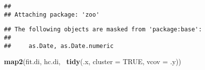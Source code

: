 \documentclass[]{article}
\newenvironment{Shaded}{\begin{snugshade}}{\end{snugshade}}
\newcommand{\KeywordTok}[1]{\textcolor[rgb]{0.13,0.29,0.53}{\textbf{{#1}}}}
\newcommand{\DataTypeTok}[1]{\textcolor[rgb]{0.13,0.29,0.53}{{#1}}}
\newcommand{\StringTok}[1]{\textcolor[rgb]{0.31,0.60,0.02}{{#1}}}
\newcommand{\OtherTok}[1]{\textcolor[rgb]{0.56,0.35,0.01}{{#1}}}
\newcommand{\NormalTok}[1]{{#1}}
\begin{document}
\begin{Shaded}
\end{Shaded}

\begin{verbatim}
## 
## Attaching package: 'zoo'
\end{verbatim}

\begin{verbatim}
## The following objects are masked from 'package:base':
## 
##     as.Date, as.Date.numeric
\end{verbatim}

\begin{Shaded}
\begin{Highlighting}[]
\KeywordTok{map2}\NormalTok{(fit.di, hc.di, ~}\KeywordTok{tidy}\NormalTok{(.x, }\DataTypeTok{cluster =} \OtherTok{TRUE}\NormalTok{, }\DataTypeTok{vcov =} \NormalTok{.y))}
\end{Highlighting}
\end{Shaded}
\end{document}
